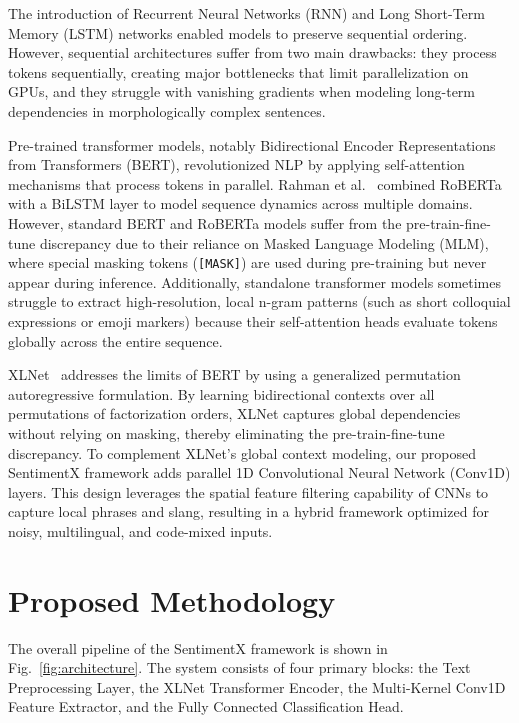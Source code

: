 \documentclass[conference]{IEEEtran}
\begin{document}
The introduction of Recurrent Neural Networks (RNN) and Long Short-Term Memory (LSTM) networks enabled models to preserve sequential ordering. However, sequential architectures suffer from two main drawbacks: they process tokens sequentially, creating major bottlenecks that limit parallelization on GPUs, and they struggle with vanishing gradients when modeling long-term dependencies in morphologically complex sentences.

Pre-trained transformer models, notably Bidirectional Encoder Representations from Transformers (BERT), revolutionized NLP by applying self-attention mechanisms that process tokens in parallel. Rahman et al.~\cite{rahman2025roberta} combined RoBERTa with a BiLSTM layer to model sequence dynamics across multiple domains. However, standard BERT and RoBERTa models suffer from the pre-train-fine-tune discrepancy due to their reliance on Masked Language Modeling (MLM), where special masking tokens (\texttt{[MASK]}) are used during pre-training but never appear during inference. Additionally, standalone transformer models sometimes struggle to extract high-resolution, local n-gram patterns (such as short colloquial expressions or emoji markers) because their self-attention heads evaluate tokens globally across the entire sequence.

XLNet~\cite{yang2019xlnet} addresses the limits of BERT by using a generalized permutation autoregressive formulation. By learning bidirectional contexts over all permutations of factorization orders, XLNet captures global dependencies without relying on masking, thereby eliminating the pre-train-fine-tune discrepancy. To complement XLNet's global context modeling, our proposed SentimentX framework adds parallel 1D Convolutional Neural Network (Conv1D) layers. This design leverages the spatial feature filtering capability of CNNs to capture local phrases and slang, resulting in a hybrid framework optimized for noisy, multilingual, and code-mixed inputs.

\section{Proposed Methodology}
The overall pipeline of the SentimentX framework is shown in Fig.~\ref{fig:architecture}. The system consists of four primary blocks: the Text Preprocessing Layer, the XLNet Transformer Encoder, the Multi-Kernel Conv1D Feature Extractor, and the Fully Connected Classification Head.
\end{document}
